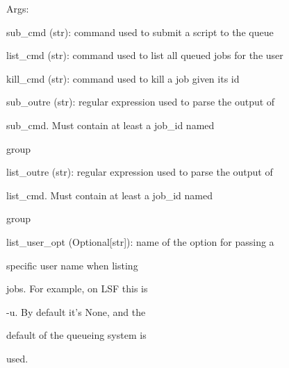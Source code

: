 \documentclass[letterpaper,10pt,english]{sphinxmanual}
\begin{document}
\begin{fulllineitems}
\begin{DUlineblock}{0em}
\item[] Args:
\item[]
\begin{DUlineblock}{\DUlineblockindent}
\item[] sub\_cmd (str): command used to submit a script to the queue
\item[] list\_cmd (str): command used to list all queued jobs for the user
\item[] kill\_cmd (str): command used to kill a job given its id
\item[] sub\_outre (str): regular expression used to parse the output of
\item[]
\begin{DUlineblock}{\DUlineblockindent}
\item[] sub\_cmd. Must contain at least a job\_id named
\item[] group
\end{DUlineblock}
\item[] list\_outre (str): regular expression used to parse the output of
\item[]
\begin{DUlineblock}{\DUlineblockindent}
\item[] list\_cmd. Must contain at least a job\_id named
\item[] group
\end{DUlineblock}
\item[] list\_user\_opt (Optional{[}str{]}): name of the option for passing a
\item[]
\begin{DUlineblock}{\DUlineblockindent}
\item[] specific user name when listing
\item[] jobs. For example, on LSF this is
\item[] -u. By default it's None, and the
\item[] default of the queueing system is
\item[] used.
\end{DUlineblock}
\end{DUlineblock}
\end{DUlineblock}

\begin{fulllineitems}
\label{doctree/soprano.hpc.submitter.queues:soprano.hpc.submitter.queues.QueueInterface.GridEngine}
\end{fulllineitems}


\end{fulllineitems}
\end{document}

